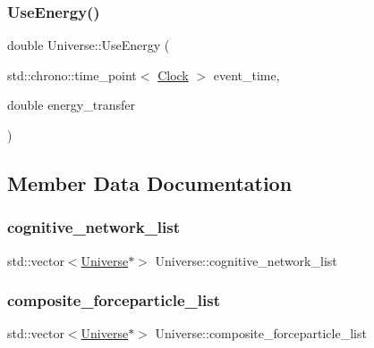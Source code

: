 \mbox{\label{classUniverse_a63e878aaf03f1800b255e9a089a72a8b}} 
\subsubsection{\texorpdfstring{Use\+Energy()}{UseEnergy()}}
{\footnotesize\ttfamily double Universe\+::\+Use\+Energy (\begin{DoxyParamCaption}\item[{std\+::chrono\+::time\+\_\+point$<$ \mbox{\hyperlink{universe_8h_a0ef8d951d1ca5ab3cfaf7ab4c7a6fd80}{Clock}} $>$}]{event\+\_\+time,  }\item[{double}]{energy\+\_\+transfer }\end{DoxyParamCaption})}



\subsection{Member Data Documentation}
\mbox{\label{classUniverse_a7a0e9796ff0d650a8b1fbde5fa5b761f}} 
\subsubsection{\texorpdfstring{cognitive\+\_\+network\+\_\+list}{cognitive\_network\_list}}
{\footnotesize\ttfamily std\+::vector$<$\mbox{\hyperlink{classUniverse}{Universe}}$\ast$$>$ Universe\+::cognitive\+\_\+network\+\_\+list\hspace{0.3cm}{\ttfamily [protected]}}

\mbox{\label{classUniverse_ae9795d06e406c4322637825aa545aa2f}} 
\subsubsection{\texorpdfstring{composite\+\_\+forceparticle\+\_\+list}{composite\_forceparticle\_list}}
{\footnotesize\ttfamily std\+::vector$<$\mbox{\hyperlink{classUniverse}{Universe}}$\ast$$>$ Universe\+::composite\+\_\+forceparticle\+\_\+list\hspace{0.3cm}{\ttfamily [protected]}}

